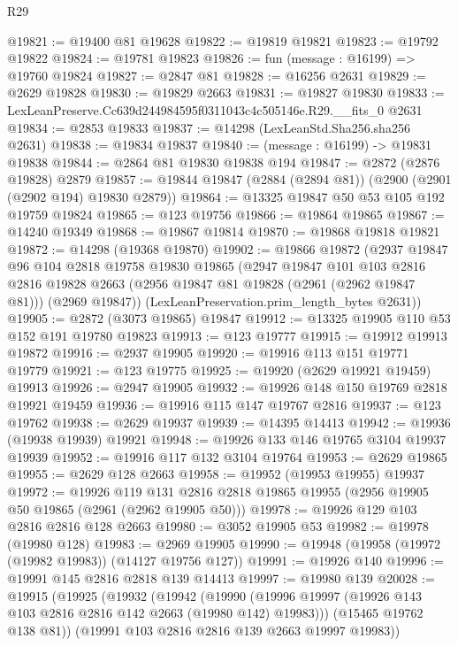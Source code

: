\begin{lexlean}{R29}
\begin{coremodule}
@19821 := @19400 @81 @19628
@19822 := @19819 @19821
@19823 := @19792 @19822
@19824 := @19781 @19823
@19826 := fun (message : @16199) => @19760 @19824
@19827 := @2847 @81
@19828 := @16256 @2631
@19829 := @2629 @19828
@19830 := @19829 @2663
@19831 := @19827 @19830
@19833 := LexLeanPreserve.Cc639d244984595f0311043c4c505146e.R29.__fits_0 @2631
@19834 := @2853 @19833
@19837 := @14298 (LexLeanStd.Sha256.sha256 @2631)
@19838 := @19834 @19837
@19840 := (message : @16199) -> @19831 @19838
@19844 := @2864 @81 @19830 @19838 @194
@19847 := @2872 (@2876 @19828) @2879
@19857 := @19844 @19847 (@2884 (@2894 @81)) (@2900 (@2901 (@2902 @194) @19830 @2879))
@19864 := @13325 @19847 @50 @53 @105 @192 @19759 @19824
@19865 := @123 @19756
@19866 := @19864 @19865
@19867 := @14240 @19349
@19868 := @19867 @19814
@19870 := @19868 @19818 @19821
@19872 := @14298 (@19368 @19870)
@19902 := @19866
    @19872
    (@2937
      @19847
      @96
      @104
      @2818
      @19758
      @19830
      @19865
      (@2947
        @19847
        @101
        @103
        @2816
        @2816
        @19828
        @2663
        (@2956 @19847 @81 @19828 (@2961 (@2962 @19847 @81)))
        (@2969 @19847))
      (LexLeanPreservation.prim_length_bytes @2631))
@19905 := @2872 (@3073 @19865) @19847
@19912 := @13325 @19905 @110 @53 @152 @191 @19780 @19823
@19913 := @123 @19777
@19915 := @19912 @19913 @19872
@19916 := @2937 @19905
@19920 := @19916 @113 @151 @19771 @19779
@19921 := @123 @19775
@19925 := @19920 (@2629 @19921 @19459) @19913
@19926 := @2947 @19905
@19932 := @19926 @148 @150 @19769 @2818 @19921 @19459
@19936 := @19916 @115 @147 @19767 @2816
@19937 := @123 @19762
@19938 := @2629 @19937
@19939 := @14395 @14413
@19942 := @19936 (@19938 @19939) @19921
@19948 := @19926 @133 @146 @19765 @3104 @19937 @19939
@19952 := @19916 @117 @132 @3104 @19764
@19953 := @2629 @19865
@19955 := @2629 @128 @2663
@19958 := @19952 (@19953 @19955) @19937
@19972 := @19926
    @119
    @131
    @2816
    @2818
    @19865
    @19955
    (@2956 @19905 @50 @19865 (@2961 (@2962 @19905 @50)))
@19978 := @19926 @129 @103 @2816 @2816 @128 @2663
@19980 := @3052 @19905 @53
@19982 := @19978 (@19980 @128)
@19983 := @2969 @19905
@19990 := @19948 (@19958 (@19972 (@19982 @19983)) (@14127 @19756 @127))
@19991 := @19926 @140
@19996 := @19991 @145 @2816 @2818 @139 @14413
@19997 := @19980 @139
@20028 := @19915
    (@19925
      (@19932
        (@19942
          (@19990 (@19996 @19997 (@19926 @143 @103 @2816 @2816 @142 @2663 (@19980 @142) @19983)))
          (@15465 @19762 @138 @81))
        (@19991 @103 @2816 @2816 @139 @2663 @19997 @19983))

\end{coremodule}
\end{lexlean}
